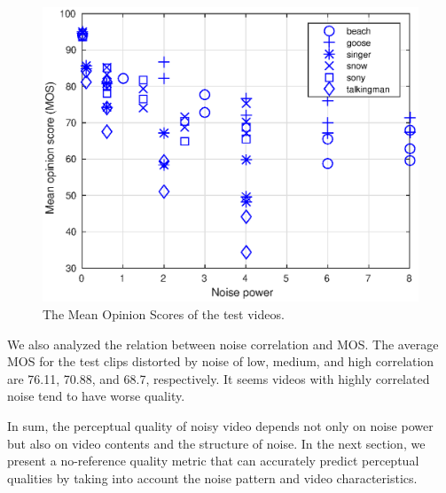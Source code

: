 \documentclass{sig-alternate}
\begin{document}
\begin{figure}[!hb]
	\centering
	\includegraphics[width=\columnwidth]{img/MOS.eps}
	\caption{\label{fig:mos} The Mean Opinion Scores of the test videos.}
\end{figure}

We also analyzed the relation between noise correlation and MOS. The average MOS for the test clips distorted by noise of low, medium, and high correlation are 76.11, 70.88, and 68.7, respectively. It seems videos with highly correlated noise tend to have worse quality.

 

In sum, the perceptual quality of noisy video depends not only on noise power but also on video contents and the structure of noise. In the next section, we present a no-reference quality metric that can accurately predict perceptual qualities by taking into account the noise pattern and video characteristics.
\end{document}
